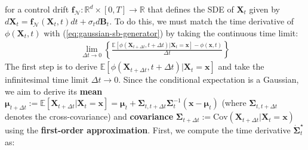 \documentclass{article}
\begin{document}
for a control drift $\boldsymbol{f}_{\mathcal{N}}:\mathbb{R}^d\times[0,T]\to \mathbb{R}$ that defines the SDE of $\boldsymbol{X}_t$ given by $d\boldsymbol{X}_t=\boldsymbol{f}_{\mathcal{N}}(\boldsymbol{X}_t,t)dt+\sigma_td\boldsymbol{B}_t$. To do this, we must match the time derivative of $\phi(\boldsymbol{X}_t,t)$ with (\ref{eq:gaussian-sb-generator}) by taking the continuous time limit:
\begin{align}
    \lim_{\Delta t\to 0}\left\{\frac{\mathbb{E}[\phi(\boldsymbol{X}_{t+\Delta t}, t+\Delta t)|\boldsymbol{X}_t=\boldsymbol{x}]-\phi(\boldsymbol{x},t)}{\Delta t}\right\}
\end{align}
The first step is to derive $\mathbb{E}[\phi(\boldsymbol{X}_{t+\Delta t}, t+\Delta t)|\boldsymbol{X}_t=\boldsymbol{x}]$ and take the infinitesimal time limit $\Delta t\to 0$. Since the conditional expectation is a Gaussian, we aim to derive its \textbf{mean} $\boldsymbol{\mu}_{t+\Delta t}:=\mathbb{E}[\boldsymbol{X}_{t+\Delta t}|\boldsymbol{X}_t=\boldsymbol{x}]=\boldsymbol{\mu}_t+\boldsymbol{\Sigma}_{t, t+\Delta t}\boldsymbol{\Sigma}_t^{-1}(\boldsymbol{x}-\boldsymbol{\mu}_t)$ (where $\boldsymbol{\Sigma}_{t, t+\Delta t}$ denotes the cross-covariance) and \textbf{covariance} $\boldsymbol{\Sigma}_{t+\Delta t}:=\text{Cov}(\boldsymbol{X}_{t+\Delta t}|\boldsymbol{X}_t=\boldsymbol{x})$ using the \textbf{first-order approximation}. First, we compute the time derivative $\dot{\boldsymbol{\Sigma}}^\star_t$ as:
\end{document}
